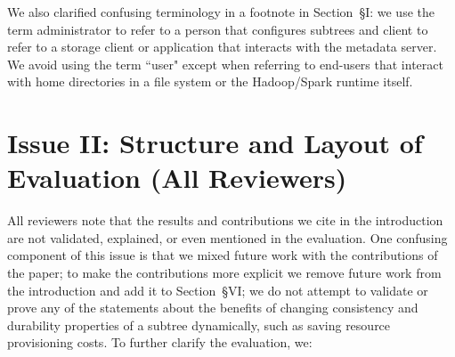 \documentclass[onecolumn,conference]{IEEEtran}
\begin{document}
We also clarified confusing terminology in a footnote in Section~{\S}I: we use
the term administrator to refer to a person that configures subtrees and client
to refer to a storage client or application that interacts with the metadata
server. We avoid using the term ``user" except when referring to end-users that
interact with home directories in a file system or the Hadoop/Spark runtime
itself.

\section*{Issue II: Structure and Layout of Evaluation (All Reviewers)}

All reviewers note that the results and contributions we cite in the
introduction are not validated, explained, or even mentioned in the evaluation.
One confusing component of this issue is that we mixed future work with the
contributions of the paper; to make the contributions more explicit we remove
future work from the introduction and add it to Section~{\S}VI; we do not
attempt to validate or prove any of the statements about the benefits of
changing consistency and durability properties of a subtree dynamically, such
as saving resource provisioning costs.  To further clarify the evaluation, we:
\end{document}
